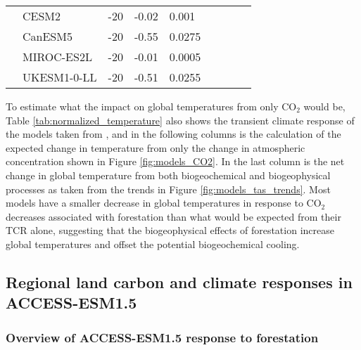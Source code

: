 \documentclass[draft]{agujournal2019}
\begin{document}
\begin{sidewaystable}
\begin{tabular}{ll|l|l|l|l|l|l|l}
                     & CESM2         & -20          & -0.02     & 0.001   &         &                   &                           &         \\
                     & CanESM5       & -20          & -0.55     & 0.0275  &         &                   &                           &         \\
                     & MIROC-ES2L    & -20          & -0.01     & 0.0005  &         &                   &                           &         \\
                     & UKESM1-0-LL   & -20          & -0.51     & 0.0255  &         &                   &                           &         \\ \hline
\end{tabular}
\end{sidewaystable}

To estimate what the impact on global temperatures from only CO$_2$ would be, Table \ref{tab:normalized_temperature} also shows the transient climate response of the models taken from , and in the following columns is the calculation of the expected change in temperature from only the change in atmospheric concentration shown in Figure \ref{fig:models_CO2}.
In the last column is the net change in global temperature from both biogeochemical and biogeophysical processes as taken from the trends in Figure \ref{fig:models_tas_trends}.
Most models have a smaller decrease in global temperatures in response to CO$_2$ decreases associated with forestation than what would be expected from their TCR alone, suggesting that the biogeophysical effects of forestation increase global temperatures and offset the potential biogeochemical cooling.

\subsection{Regional land carbon and climate responses in ACCESS-ESM1.5}

\subsubsection{Overview of ACCESS-ESM1.5 response to forestation}
\end{document}
